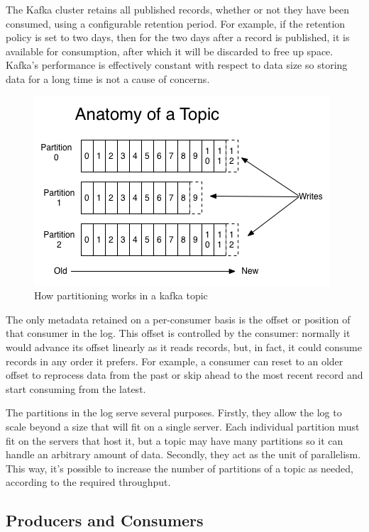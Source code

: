 The Kafka cluster retains all published records, whether or not they have been consumed, using a configurable retention period. For example, if the retention policy is set to two days, then for the two days after a record is published, it is available for consumption, after which it will be discarded to free up space. Kafka's performance is effectively constant with respect to data size so storing data for a long time is not a cause of concerns.


\begin{figure}[h]
    \centering
    \includegraphics[width=0.7\linewidth]{Figures/log_anatomy}
    \caption[How partition works in kafka a topic]{How partitioning works in a kafka topic}
    \label{fig:loganatomy}
\end{figure}

The only metadata retained on a per-consumer basis is the offset or position of that consumer in the log. This offset is controlled by the consumer: normally it would advance its offset linearly as it reads records, but, in fact, it could consume records in any order it prefers. For example, a consumer can reset to an older offset to reprocess data from the past or skip ahead to the most recent record and start consuming from the latest.

The partitions in the log serve several purposes. Firstly, they allow the log to scale beyond a size that will fit on a single server. Each individual partition must fit on the servers that host it, but a topic may have many partitions so it can handle an arbitrary amount of data. Secondly, they act as the unit of parallelism. This way, it's possible to increase the number of partitions of a topic as needed, according to the required throughput.

\subsection{Producers and Consumers}

